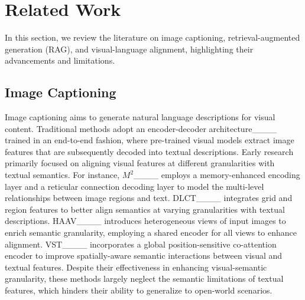 \section{Related Work}
In this section, we review the literature on image captioning, retrieval-augmented generation (RAG), and visual-language alignment, highlighting their advancements and limitations.

\subsection{Image Captioning} 
Image captioning aims to generate natural language descriptions for visual content. Traditional methods adopt an encoder-decoder architecture____ trained in an end-to-end fashion, where pre-trained visual models extract image features that are subsequently decoded into textual descriptions. Early research primarily focused on aligning visual features at different granularities with textual semantics. For instance, $M^{2}$____ employs a memory-enhanced encoding layer and a reticular connection decoding layer to model the multi-level relationships between image regions and text. DLCT____ integrates grid and region features to better align semantics at varying granularities with textual descriptions. HAAV____ introduces heterogeneous views of input images to enrich semantic granularity, employing a shared encoder for all views to enhance alignment. VST____ incorporates a global position-sensitive co-attention encoder to improve spatially-aware semantic interactions between visual and textual features.
Despite their effectiveness in enhancing visual-semantic granularity, these methods largely neglect the semantic limitations of textual features, which hinders their ability to generalize to open-world scenarios. 

